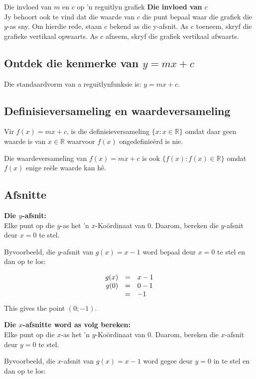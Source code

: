 \begin{Ondersoek}{Die invloed van $m$ en $c$ op 'n reguitlyn grafiek}
\textbf{Die invloed van $c$}\\
Jy behoort ook te vind dat die waarde van $c$ die punt bepaal waar die grafiek die $y$-as sny. Om hierdie rede, staan $c$ bekend as die y-afsnit. As $c$ toeneem, skryf die grafieke vertikaal opwaarts. As $c$ afneem, skryf die grafiek vertikaal afwaarts.\par 


\subsection*{Ontdek die kenmerke van $y=mx +c$} 
Die standaardvorm van a reguitlynfunksie is:  $y=mx + c$. 
\subsection*{Definisieversameling en waardeversameling}
\nopagebreak
Vir $f(x)=mx+c$, is die definisieversameling $\{x:x\in \mathbb{R}\}$ omdat daar geen waarde is van  $x\in \mathbb{R}$ waarvoor $f(x)$ ongedefinieërd is nie.\par 
Die waardeversameling van $f(x)=mx+c$ is ook $\{f(x):f(x)\in \mathbb{R}\}$ omdat $f(x)$ enige re\"ele waarde kan h\^e.\par 
\par 

\subsection*{Afsnitte}
\textbf{Die $y$-afsnit:}\\
Elke punt op die $y$-as het 'n $x$-Ko\"ordinaat van $0$. Daarom, bereken die $y$-afsnit deur $x=0$ te stel.\par
Byvoorbeeld, die $y$-afsnit van $g(x)=x-1$ word bepaal deur $x=0$ te stel en dan op te los:\par 

\begin{equation*}
\begin{array}{ccl}\hfill g(x)& =& x-1\hfill \\
\hfill g(0) &=& 0-1\hfill \\
& =& -1\hfill 
\end{array}
\end{equation*}
This gives the point $(0;-1)$.\par

\textbf{Die $x$-afsnitte word as volg bereken:}\\
Elke punt op die $x$-as het 'n $y$-Ko\"ordinaat van $0$. Daarom, bereken die $x$-afsnit deur $y=0$ te stel. \par
Byvoorbeeld, die $x$-afsnit van $g(x)=x-1$ word gegee deur $y=0$ in te stel en dan op te los:\par 


\end{Ondersoek}
